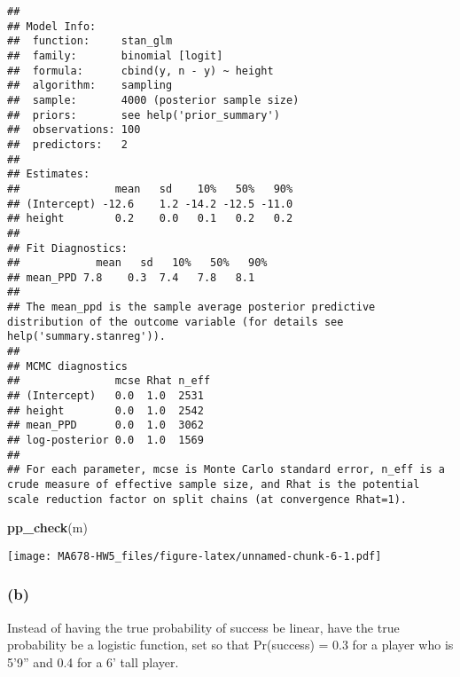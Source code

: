 \documentclass[
]{article}
\newenvironment{Shaded}{\begin{snugshade}}{\end{snugshade}}
\newcommand{\FunctionTok}[1]{\textcolor[rgb]{0.13,0.29,0.53}{\textbf{#1}}}
\newcommand{\NormalTok}[1]{#1}
\begin{document}
\begin{verbatim}
## 
## Model Info:
##  function:     stan_glm
##  family:       binomial [logit]
##  formula:      cbind(y, n - y) ~ height
##  algorithm:    sampling
##  sample:       4000 (posterior sample size)
##  priors:       see help('prior_summary')
##  observations: 100
##  predictors:   2
## 
## Estimates:
##               mean   sd    10%   50%   90%
## (Intercept) -12.6    1.2 -14.2 -12.5 -11.0
## height        0.2    0.0   0.1   0.2   0.2
## 
## Fit Diagnostics:
##            mean   sd   10%   50%   90%
## mean_PPD 7.8    0.3  7.4   7.8   8.1  
## 
## The mean_ppd is the sample average posterior predictive distribution of the outcome variable (for details see help('summary.stanreg')).
## 
## MCMC diagnostics
##               mcse Rhat n_eff
## (Intercept)   0.0  1.0  2531 
## height        0.0  1.0  2542 
## mean_PPD      0.0  1.0  3062 
## log-posterior 0.0  1.0  1569 
## 
## For each parameter, mcse is Monte Carlo standard error, n_eff is a crude measure of effective sample size, and Rhat is the potential scale reduction factor on split chains (at convergence Rhat=1).
\end{verbatim}

\begin{Shaded}
\begin{Highlighting}[]
\FunctionTok{pp\_check}\NormalTok{(m)}
\end{Highlighting}
\end{Shaded}

\texttt{[image: MA678-HW5\_files/figure-latex/unnamed-chunk-6-1.pdf]}

\hypertarget{b-1}{%
\subsubsection{(b)}\label{b-1}}

Instead of having the true probability of success be linear, have the
true probability be a logistic function, set so that Pr(success) = 0.3
for a player who is 5'9'' and 0.4 for a 6' tall player.
\end{document}
